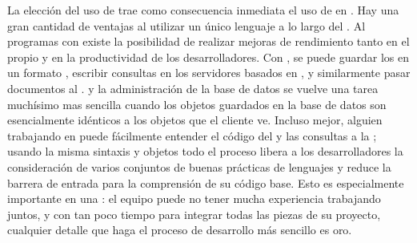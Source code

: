 La elección del uso de \nodejsNAME trae como consecuencia inmediata el uso de \javaScriptNAME en \serverSideAS. Hay una gran cantidad de ventajas al utilizar un único lenguaje a lo largo del \stackAS. Al programas con \javaScriptNAME existe la posibilidad de realizar mejoras de rendimiento tanto en el propio \softwarePC y en la productividad de los desarrolladores. Con \mongodbNAME, se puede guardar los \documentsDB en un formato \jsonLikeCPT, escribir consultas \jsonNAME en los servidores basados en \nodejsNAME, y similarmente pasar documentos \jsonNAME al \frontEndAS. \debuggingPL y la administración de la base de datos se vuelve una tarea muchísimo mas sencilla cuando los objetos guardados en la base de datos son esencialmente idénticos a los objetos que el cliente \javaScriptNAME ve. Incluso mejor, alguien trabajando en \clientSideAS puede fácilmente entender el código del \serverSideAS y las consultas a la \dataBaseDB; usando la misma sintaxis y objetos todo el proceso libera a los desarrolladores la consideración de varios conjuntos de buenas prácticas de lenguajes y reduce la barrera de entrada para la comprensión de su código base. Esto es especialmente importante en una \hackathonCPT: el equipo puede no tener mucha experiencia trabajando juntos, y con tan poco tiempo para integrar todas las piezas de su proyecto, cualquier detalle que haga el proceso de desarrollo más sencillo es oro.



